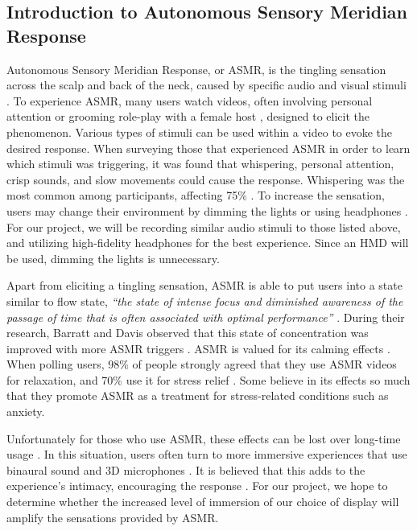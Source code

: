 \documentclass{sigchi}
\newcommand{\inlinequote}[1]{\textit{``#1''}}
\begin{document}
\subsection{Introduction to Autonomous Sensory Meridian Response}
Autonomous Sensory Meridian Response, or ASMR, is the tingling sensation across the scalp and back of the neck, caused by specific audio and visual stimuli \cite{barratt2015autonomous}. To experience ASMR, many users watch videos, often involving personal attention or grooming role-play \cite{andersen2015now,barratt2015autonomous} with a female host \cite{andersen2015now}, designed to elicit the phenomenon. Various types of stimuli can be used within a video to evoke the desired response\cite{barratt2015autonomous}. When surveying those that experienced ASMR in order to learn which stimuli was triggering, it was found that whispering, personal attention, crisp sounds, and slow movements could cause the response. Whispering was the most common among participants, affecting 75\% \cite{barratt2015autonomous}. To increase the sensation, users may change their environment by dimming the lights or using headphones \cite{begman2015}. For our project, we will be recording similar audio stimuli to those listed above, and utilizing high-fidelity headphones for the best experience. Since an HMD will be used, dimming the lights is unnecessary.

Apart from eliciting a tingling sensation, ASMR is able to put users into a state similar to flow state, \inlinequote{the state of intense focus and diminished awareness of the passage of time that is often associated with optimal performance} \cite{barratt2015autonomous}. During their research, Barratt and Davis observed that this state of concentration was improved with more ASMR triggers \cite{barratt2015autonomous}. ASMR is valued for its calming effects \cite{barratt2015autonomous}. When polling users, 98\% of people strongly agreed that they use ASMR videos for relaxation, and 70\% use it for stress relief \cite{barratt2015autonomous}. Some believe in its effects so much that they promote ASMR as a treatment for stress-related conditions such as anxiety\cite{andersen2015now,begman2015}.

Unfortunately for those who use ASMR, these effects can be lost over long-time usage \cite{andersen2015now}. In this situation, users often turn to more immersive experiences that use binaural sound and 3D microphones \cite{andersen2015now}. It is believed that this adds to the experience's intimacy, encouraging the response \cite{andersen2015now}. For our project, we hope to determine whether the increased level of immersion of our choice of display will amplify the sensations provided by ASMR.
\end{document}
